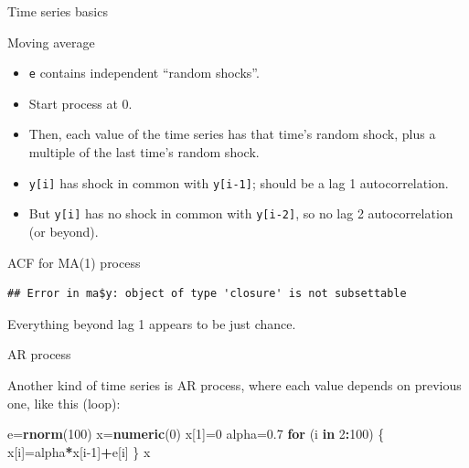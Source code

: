 \documentclass[ignorenonframetext,]{beamer}
\newenvironment{Shaded}{\begin{snugshade}}{\end{snugshade}}
\newcommand{\ControlFlowTok}[1]{\textcolor[rgb]{0.13,0.29,0.53}{\textbf{#1}}}
\newcommand{\DataTypeTok}[1]{\textcolor[rgb]{0.13,0.29,0.53}{#1}}
\newcommand{\DecValTok}[1]{\textcolor[rgb]{0.00,0.00,0.81}{#1}}
\newcommand{\FloatTok}[1]{\textcolor[rgb]{0.00,0.00,0.81}{#1}}
\newcommand{\KeywordTok}[1]{\textcolor[rgb]{0.13,0.29,0.53}{\textbf{#1}}}
\newcommand{\NormalTok}[1]{#1}
\newcommand{\OperatorTok}[1]{\textcolor[rgb]{0.81,0.36,0.00}{\textbf{#1}}}
\newcommand{\StringTok}[1]{\textcolor[rgb]{0.31,0.60,0.02}{#1}}
\providecommand{\tightlist}{%
  \setlength{\itemsep}{0pt}\setlength{\parskip}{0pt}}
\begin{document}
\begin{frame}[fragile]{Time series basics}
\begin{block}{Moving average}
\begin{itemize}
\tightlist
\item
  \texttt{e} contains independent ``random shocks''.
\item
  Start process at 0.
\item
  Then, each value of the time series has that time's random shock, plus
  a multiple of the last time's random shock.
\item
  \texttt{y{[}i{]}} has shock in common with \texttt{y{[}i-1{]}}; should
  be a lag 1 autocorrelation.
\item
  But \texttt{y{[}i{]}} has no shock in common with \texttt{y{[}i-2{]}},
  so no lag 2 autocorrelation (or beyond).
\end{itemize}

ACF for MA(1) process

\begin{Shaded}
\end{Shaded}

\begin{verbatim}
## Error in ma$y: object of type 'closure' is not subsettable
\end{verbatim}

Everything beyond lag 1 appears to be just chance.

\end{block}

\begin{block}{AR process}

Another kind of time series is AR process, where each value depends on
previous one, like this (loop):

\begin{Shaded}
\begin{Highlighting}[]
\NormalTok{e=}\KeywordTok{rnorm}\NormalTok{(}\DecValTok{100}\NormalTok{)}
\NormalTok{x=}\KeywordTok{numeric}\NormalTok{(}\DecValTok{0}\NormalTok{)}
\NormalTok{x[}\DecValTok{1}\NormalTok{]=}\DecValTok{0}
\NormalTok{alpha=}\FloatTok{0.7}
\ControlFlowTok{for}\NormalTok{ (i }\ControlFlowTok{in} \DecValTok{2}\OperatorTok{:}\DecValTok{100}\NormalTok{)}
\NormalTok{\{}
\NormalTok{  x[i]=alpha}\OperatorTok{*}\NormalTok{x[i}\DecValTok{-1}\NormalTok{]}\OperatorTok{+}\NormalTok{e[i]}
\NormalTok{\}}
\NormalTok{x}
\end{Highlighting}
\end{Shaded}


\end{block}
\end{frame}
\end{document}

